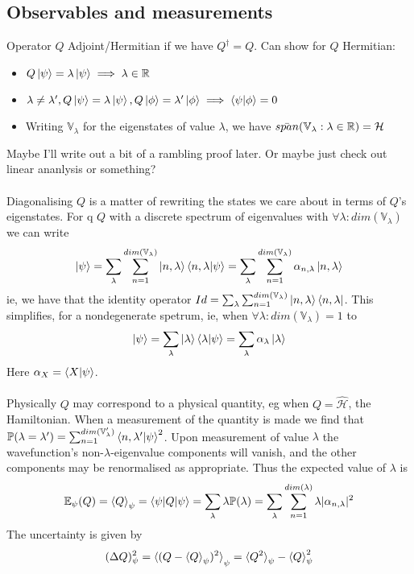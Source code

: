 \documentclass{article}
\begin{document}
\subsection{Observables and measurements}
Operator $Q$ Adjoint/Hermitian if we have $Q^\dagger=Q$.  Can show for $Q$ Hermitian:
\begin{itemize}
  \item $Q\ket{\psi}=\lambda\ket{\psi}\implies\lambda\in\mathbb{R}$
  \item $\lambda \neq \lambda',Q\ket{\psi}=\lambda\ket{\psi},Q\ket{\phi}=\lambda'\ket{\phi}\implies \braket{\psi|\phi}=0$
  \item Writing $\mathbb{V}_\lambda$ for the eigenstates of value $\lambda$, we have $\Bar{span}({\mathbb{V}_\lambda:\lambda\in\mathbb{R}})=\mathcal{H}$
\end{itemize}
Maybe I'll write out a bit of a rambling proof later.  Or maybe just check out linear ananlysis or something?
\\
\\
Diagonalising $Q$ is a matter of rewriting the states we care about in terms of $Q$'s eigenstates.  For q $Q$ with a discrete spectrum of eigenvalues with $\forall\lambda: dim(\mathbb{V}_\lambda)$ we can write
$$
  \ket{\psi}=\sum_\lambda\sum_{n=1}^{dim(\mathbb{V}_\lambda)}\ket{n,\lambda}\braket{n,\lambda|\psi}=\sum_\lambda\sum_{n=1}^{dim(\mathbb{V}_\lambda)}\alpha_{n,\lambda}\ket{n,\lambda}
$$
ie,  we have  that the identity operator $Id=\sum_\lambda\sum_{n=1}^{dim(\mathbb{V}_\lambda)}\ket{n,\lambda}\bra{n,\lambda}$.  This simplifies, for a nondegenerate spetrum, ie, when $\forall\lambda:dim(\mathbb{V}_\lambda)=1$ to
$$
  \ket{\psi}=\sum_\lambda\ket{\lambda}\braket{\lambda|\psi}=\sum_\lambda\alpha_{\lambda}\ket{\lambda}
$$
Here $\alpha_X=\braket{X|\psi}$.
\\
\\
Physically $Q$ may correspond to a physical quantity, eg when $Q=\hat{\mathcal{H}}$, the Hamiltonian.  When a measurement of the quantity is made we find that $\mathbb{P}(\lambda=\lambda')=\sum_{n=1}^{dim(\mathbb{V}_\lambda')}\braket{n,\lambda'|\psi}^2$.  Upon measurement of value $\lambda$ the wavefunction's non-$\lambda$-eigenvalue components will vanish, and the other components may be renormalised as appropriate.  Thus the expected value of $\lambda$ is
$$
  \mathbb{E}_\psi(Q)=\braket{Q}_\psi=\braket{\psi|Q|\psi}=\sum_\lambda\lambda\mathbb{P}(\lambda)=\sum_\lambda\sum_{n=1}^{dim(\lambda)}\lambda|\alpha_{n,\lambda}|^2
$$
The uncertainty is given by
$$
  (\Delta Q)_\psi^2=\braket{(Q-\braket{Q}_\psi)^2}_\psi=\braket{Q^2}_\psi-\braket{Q}_\psi^2
$$
\end{document}
